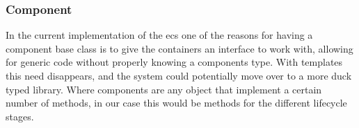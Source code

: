 \subsubsection{Component}
In the current implementation of the ecs one of the reasons for having a component
base class is to give the containers an interface to work with, allowing for
generic code without properly knowing a components type.
With templates this need disappears, and the system could potentially move
over to a more duck typed library.
Where components are any object that implement a certain number of methods,
in our case this would be methods for the different lifecycle stages.
